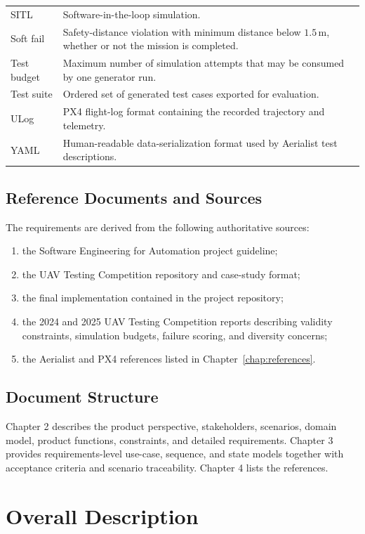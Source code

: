 \documentclass[11pt,a4paper,openany]{report}
\begin{document}
\begin{longtable}{L{3.3cm} L{11.5cm}}
SITL & Software-in-the-loop simulation.\\
Soft fail & Safety-distance violation with minimum distance below $1.5\,\mathrm{m}$, whether or not the mission is completed.\\
Test budget & Maximum number of simulation attempts that may be consumed by one generator run.\\
Test suite & Ordered set of generated test cases exported for evaluation.\\
ULog & PX4 flight-log format containing the recorded trajectory and telemetry.\\
YAML & Human-readable data-serialization format used by Aerialist test descriptions.\\
\bottomrule
\end{longtable}

\section{Reference Documents and Sources}
The requirements are derived from the following authoritative sources:
\begin{enumerate}
  \item the Software Engineering for Automation project guideline;
  \item the UAV Testing Competition repository and case-study format;
  \item the final implementation contained in the project repository;
  \item the 2024 and 2025 UAV Testing Competition reports describing validity constraints, simulation budgets, failure scoring, and diversity concerns;
  \item the Aerialist and PX4 references listed in Chapter~\ref{chap:references}.
\end{enumerate}

\section{Document Structure}
Chapter 2 describes the product perspective, stakeholders, scenarios, domain model, product functions, constraints, and detailed requirements. Chapter 3 provides requirements-level use-case, sequence, and state models together with acceptance criteria and scenario traceability. Chapter 4 lists the references.

\chapter{Overall Description}
\end{document}
